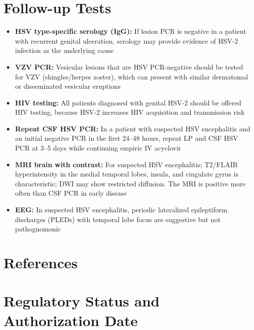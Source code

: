 \section*{Follow-up Tests}
\begin{itemize}
  \item \textbf{HSV type-specific serology (IgG):} If lesion PCR is negative in a patient with recurrent genital ulceration, serology may provide evidence of HSV-2 infection as the underlying cause
  \item \textbf{VZV PCR:} Vesicular lesions that are HSV PCR-negative should be tested for VZV (shingles/herpes zoster), which can present with similar dermatomal or disseminated vesicular eruptions
  \item \textbf{HIV testing:} All patients diagnosed with genital HSV-2 should be offered HIV testing, because HSV-2 increases HIV acquisition and transmission risk
  \item \textbf{Repeat CSF HSV PCR:} In a patient with suspected HSV encephalitis and an initial negative PCR in the first 24--48 hours, repeat LP and CSF HSV PCR at 3--5 days while continuing empiric IV acyclovir
  \item \textbf{MRI brain with contrast:} For suspected HSV encephalitis; T2/FLAIR hyperintensity in the medial temporal lobes, insula, and cingulate gyrus is characteristic; DWI may show restricted diffusion. The MRI is positive more often than CSF PCR in early disease
  \item \textbf{EEG:} In suspected HSV encephalitis, periodic lateralized epileptiform discharges (PLEDs) with temporal lobe focus are suggestive but not pathognomonic
\end{itemize}

\section*{References}



\clearpage
\section*{Regulatory Status and Authorization Date}

\clearpage
